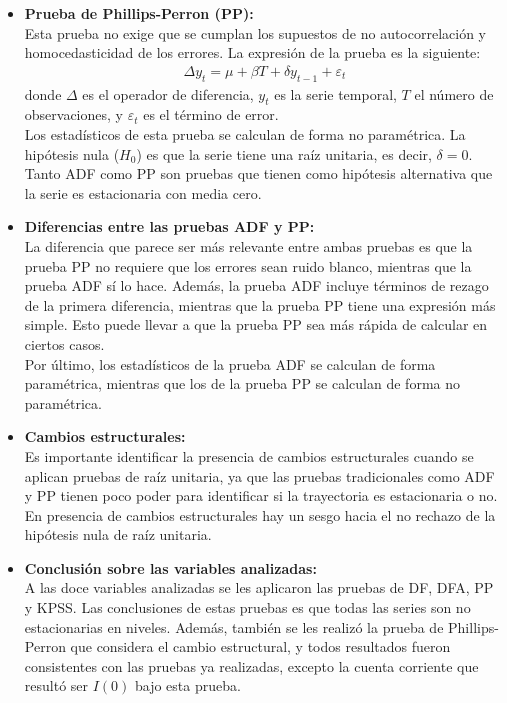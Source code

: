 \documentclass[12pt]{article}
\begin{document}
\begin{itemize}
    \item \textbf{Prueba de Phillips-Perron (PP):} \\
    Esta prueba no exige que se cumplan los supuestos de no autocorrelación y
    homocedasticidad de los errores. La expresión de la prueba es la siguiente:
    \begin{align}
        \Delta y_t = \mu + \beta T + \delta y_{t-1} + \varepsilon_t
    \end{align}
    donde $\Delta$ es el operador de diferencia, $y_t$ es la serie temporal,
    $T$ el número de observaciones, y $\varepsilon_t$ es el término de error.\\
    Los estadísticos de esta prueba se calculan de forma no paramétrica. La hipótesis nula ($H_0$) es que la serie tiene una raíz
    unitaria, es decir, $\delta=0$.\\
    Tanto ADF como PP son pruebas que tienen como hipótesis alternativa 
    que la serie es estacionaria con media cero.

    \item \textbf{Diferencias entre las pruebas ADF y PP:} \\
    La diferencia que parece ser más relevante entre ambas pruebas es que la prueba PP
    no requiere que los errores sean ruido blanco, mientras que la prueba ADF sí lo hace.
    Además, la prueba ADF incluye términos de rezago de la primera diferencia, 
    mientras que la prueba PP tiene una expresión más simple. Esto puede llevar
    a que la prueba PP sea más rápida de calcular en ciertos casos.\\
    Por último, los estadísticos de la prueba ADF se calculan de forma paramétrica, mientras que
    los de la prueba PP se calculan de forma no paramétrica.\\

    \item \textbf{Cambios estructurales:}\\
    Es importante identificar la presencia de cambios estructurales cuando 
    se aplican pruebas de raíz unitaria, ya que las pruebas tradicionales como ADF y PP
    tienen poco poder para identificar si la trayectoria es estacionaria o no. 
    En presencia de cambios estructurales hay un sesgo hacia el no rechazo 
    de la hipótesis nula de raíz unitaria.

    \item \textbf{Conclusión sobre las variables analizadas:}\\
    A las doce variables analizadas se les aplicaron las pruebas de DF, DFA, PP y KPSS.
    Las conclusiones de estas pruebas es que todas las series son no estacionarias en niveles. 
    Además, también se les realizó la prueba de Phillips-Perron que considera el cambio
    estructural, y todos resultados fueron consistentes con las pruebas ya realizadas, excepto
    la cuenta corriente que resultó ser $I(0)$ bajo esta prueba.
    
\end{itemize}




\end{document}
